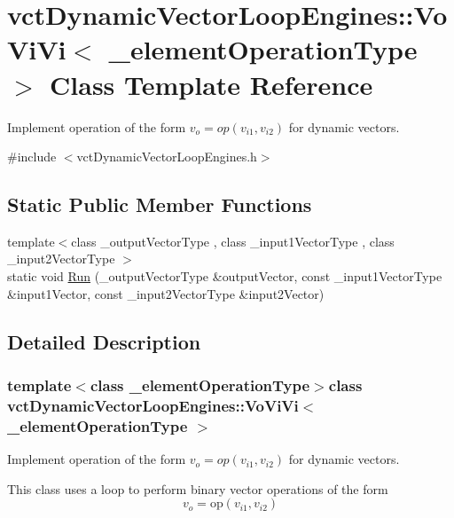 \hypertarget{classvct_dynamic_vector_loop_engines_1_1_vo_vi_vi}{\section{vct\-Dynamic\-Vector\-Loop\-Engines\-:\-:Vo\-Vi\-Vi$<$ \-\_\-element\-Operation\-Type $>$ Class Template Reference}
\label{classvct_dynamic_vector_loop_engines_1_1_vo_vi_vi}
}


Implement operation of the form $v_o = op(v_{i1}, v_{i2})$ for dynamic vectors.  




{\ttfamily \#include $<$vct\-Dynamic\-Vector\-Loop\-Engines.\-h$>$}

\subsection*{Static Public Member Functions}
\begin{DoxyCompactItemize}
\item 
{\footnotesize template$<$class \-\_\-output\-Vector\-Type , class \-\_\-input1\-Vector\-Type , class \-\_\-input2\-Vector\-Type $>$ }\\static void \hyperlink{classvct_dynamic_vector_loop_engines_1_1_vo_vi_vi_a908a77f7ed8af039a3c0cdbe36be2757}{Run} (\-\_\-output\-Vector\-Type \&output\-Vector, const \-\_\-input1\-Vector\-Type \&input1\-Vector, const \-\_\-input2\-Vector\-Type \&input2\-Vector)
\end{DoxyCompactItemize}


\subsection{Detailed Description}
\subsubsection*{template$<$class \-\_\-element\-Operation\-Type$>$class vct\-Dynamic\-Vector\-Loop\-Engines\-::\-Vo\-Vi\-Vi$<$ \-\_\-element\-Operation\-Type $>$}

Implement operation of the form $v_o = op(v_{i1}, v_{i2})$ for dynamic vectors. 

This class uses a loop to perform binary vector operations of the form \[ v_o = \mathrm{op}(v_{i1}, v_{i2}) \]

